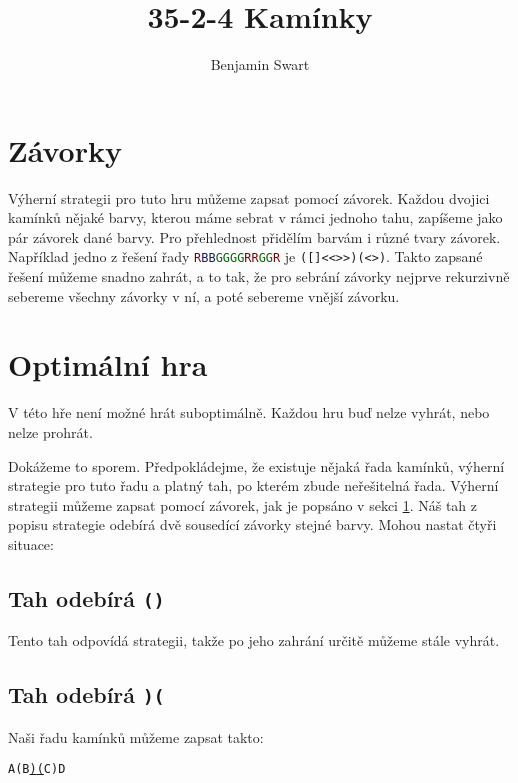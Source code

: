 \documentclass{article}
\title{35-2-4 Kamínky}
\author{Benjamin Swart}
\newcommand{\brackets}[4]{{\color{#1}#2}#4{\color{#1}#3}}
\newcommand{\bred}[1]{\brackets{Maroon}{(}{)}{#1}}
\newcommand{\bgreen}[1]{\brackets{DarkGreen}{<}{>}{#1}}
\newcommand{\bblue}[1]{\brackets{MidnightBlue}{[}{]}{#1}}
\newcommand{\bredl}{{\color{Maroon}(}}
\newcommand{\bredr}{{\color{Maroon})}}
\newcommand{\mred}{\textcolor{Maroon}{R}}
\newcommand{\mgreen}{\textcolor{DarkGreen}{G}}
\newcommand{\mblue}{\textcolor{MidnightBlue}{B}}
\begin{document}
\maketitle

\section{Závorky}
\label{section:parens}

Výherní strategii pro tuto hru můžeme zapsat pomocí závorek. Každou dvojici kamínků nějaké barvy, kterou máme sebrat v rámci jednoho tahu, zapíšeme jako pár závorek dané barvy. Pro přehlednost přidělím barvám i různé tvary závorek. Například jedno z řešení řady \texttt{\mred\mblue\mblue\mgreen\mgreen\mgreen\mgreen\mred\mred\mgreen\mgreen\mred} je \texttt{\bred{\bblue{}\bgreen{\bgreen{}}}\bred{\bgreen{}}}. Takto zapsané řešení můžeme snadno zahrát, a to tak, že pro sebrání závorky nejprve rekurzivně sebereme všechny závorky v ní, a poté sebereme vnější závorku.

\section{Optimální hra}

V této hře není možné hrát suboptimálně. Každou hru buď nelze vyhrát, nebo nelze prohrát.

Dokážeme to sporem. Předpokládejme, že existuje nějaká řada kamínků, výherní strategie pro tuto řadu a platný tah, po kterém zbude neřešitelná řada. Výherní strategii můžeme zapsat pomocí závorek, jak je popsáno v sekci \ref{section:parens}. Náš tah z popisu strategie odebírá dvě sousedící závorky stejné barvy. Mohou nastat čtyři situace:

\subsection[Tah odebírá ()]{Tah odebírá \texttt{\bred{}}}

Tento tah odpovídá strategii, takže po jeho zahrání určitě můžeme stále vyhrát.

\subsection[Tah odebírá )(]{Tah odebírá \texttt{\bredr\bredl}}

Naši řadu kamínků můžeme zapsat takto:

\begin{center}
    \texttt{{A}\bredl{B}\underline{\bredr\bredl}{C}\bredr{D}}
\end{center}
\end{document}
